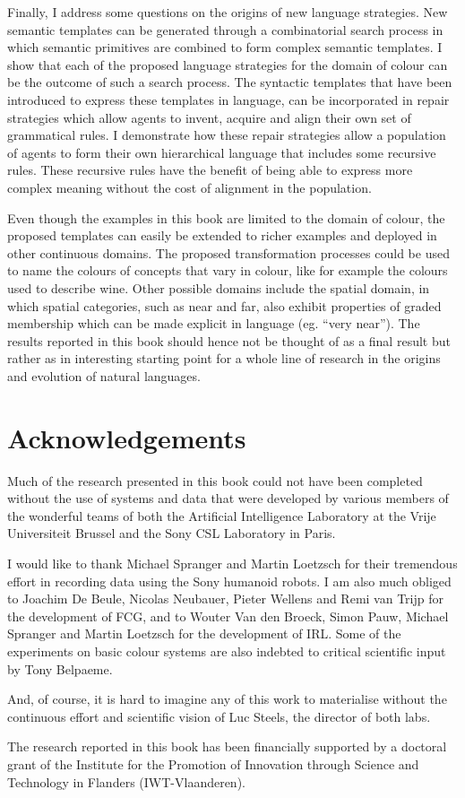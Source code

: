 Finally, I address some questions on the origins of new language
strategies. New semantic templates can be generated through a
combinatorial search process in which semantic primitives are combined
to form complex semantic templates. I show that each of the proposed
language strategies for the domain of colour can be the outcome of
such a search process. The syntactic templates that have been
introduced to express these templates in language, can be incorporated
in repair strategies which allow agents to invent, acquire and align
their own set of grammatical rules. I demonstrate how these repair
strategies allow a population of agents to form their own hierarchical
language that includes some recursive rules. These recursive rules
have the benefit of being able to express more complex meaning without
the cost of alignment in the population.

Even though the examples in this book are limited to the domain of
colour, the proposed templates can easily be extended to richer
examples and deployed in other continuous domains. The proposed
transformation processes could be used to name the colours of concepts
that vary in colour, like for example the colours used to describe
wine. Other possible domains include the spatial domain, in which
spatial categories, such as near and far, also exhibit properties of
graded membership which can be made explicit in language (eg. ``very
near'').  The results reported in this book should hence not be
thought of as a final result but rather as in interesting starting
point for a whole line of research in the origins and evolution of
natural languages.

\section*{Acknowledgements}

Much of the research presented in this book could not have been completed without the use of systems and data that were developed by various members of the wonderful teams of both the Artificial Intelligence Laboratory at the Vrije Universiteit Brussel and the Sony CSL Laboratory in Paris.

I would like to thank Michael Spranger and Martin Loetzsch for their tremendous effort in recording data using the Sony humanoid robots. I am also much obliged to Joachim De Beule, Nicolas Neubauer, Pieter Wellens and Remi van Trijp for the development of FCG, and to Wouter Van den Broeck, Simon Pauw, Michael Spranger and Martin Loetzsch for the development of IRL. Some of the experiments on basic colour systems are also indebted to critical scientific input by Tony Belpaeme. 

And, of course, it is hard to imagine any of this work to materialise without the continuous effort and scientific vision of Luc Steels, the director of both labs.

The research reported in this book has been financially supported by a doctoral grant of the Institute for the Promotion of Innovation through Science and Technology in Flanders  (IWT-Vlaanderen).
